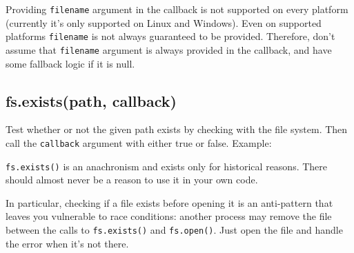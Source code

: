 Providing \texttt{filename} argument in the callback is not supported on
every platform (currently it's only supported on Linux and Windows).
Even on supported platforms \texttt{filename} is not always guaranteed
to be provided. Therefore, don't assume that \texttt{filename} argument
is always provided in the callback, and have some fallback logic if it
is null.

\begin{Shaded}
\begin{Highlighting}[]
\NormalTok{(}\NormalTok{, } 
  \NormalTok{(} 
   
    \NormalTok{(} 
  \NormalTok{\} } \NormalTok{\{}
    \NormalTok{(}\NormalTok{);}
  \NormalTok{\}}
\NormalTok{\});}
\end{Highlighting}
\end{Shaded}

\subsection{fs.exists(path, callback)}\label{fs.existspath-callback}

Test whether or not the given path exists by checking with the file
system. Then call the \texttt{callback} argument with either true or
false. Example:

\begin{Shaded}
\begin{Highlighting}[]
\NormalTok{(}\NormalTok{, } 
   \NormalTok{: }\NormalTok{);}
\NormalTok{\});}
\end{Highlighting}
\end{Shaded}

\texttt{fs.exists()} is an anachronism and exists only for historical
reasons. There should almost never be a reason to use it in your own
code.

In particular, checking if a file exists before opening it is an
anti-pattern that leaves you vulnerable to race conditions: another
process may remove the file between the calls to \texttt{fs.exists()}
and \texttt{fs.open()}. Just open the file and handle the error when
it's not there.

